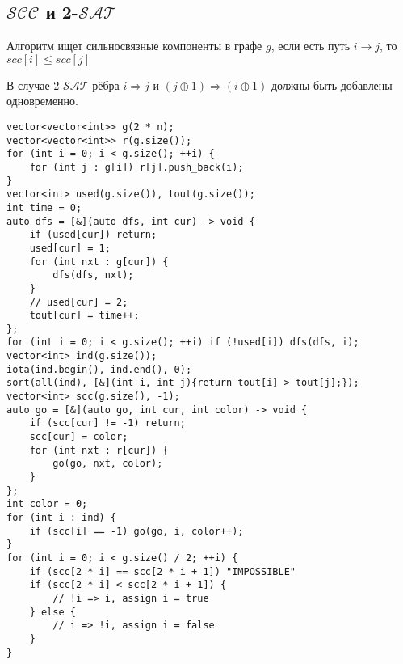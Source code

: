 \subsection{$\mathcal{SCC}$ и 2-$\mathcal{SAT}$}
Алгоритм ищет сильносвязные компоненты в графе $g$, если есть путь $i \rightarrow j$, то $scc[i] \le scc[j]$

В случае 2-$\mathcal{SAT}$ рёбра $i \Rightarrow j$ и $(j\oplus1) \Rightarrow (i \oplus 1)$ должны быть добавлены одновременно.
\begin{lstlisting}
vector<vector<int>> g(2 * n);
vector<vector<int>> r(g.size());
for (int i = 0; i < g.size(); ++i) {
    for (int j : g[i]) r[j].push_back(i);
}
vector<int> used(g.size()), tout(g.size());
int time = 0;
auto dfs = [&](auto dfs, int cur) -> void {
    if (used[cur]) return;
    used[cur] = 1;
    for (int nxt : g[cur]) {
        dfs(dfs, nxt);
    }
    // used[cur] = 2;
    tout[cur] = time++;
};
for (int i = 0; i < g.size(); ++i) if (!used[i]) dfs(dfs, i);
vector<int> ind(g.size());
iota(ind.begin(), ind.end(), 0);
sort(all(ind), [&](int i, int j){return tout[i] > tout[j];});
vector<int> scc(g.size(), -1);
auto go = [&](auto go, int cur, int color) -> void {
    if (scc[cur] != -1) return;
    scc[cur] = color;
    for (int nxt : r[cur]) {
        go(go, nxt, color);
    }
};
int color = 0;
for (int i : ind) {
    if (scc[i] == -1) go(go, i, color++);
}
for (int i = 0; i < g.size() / 2; ++i) {
    if (scc[2 * i] == scc[2 * i + 1]) "IMPOSSIBLE"
    if (scc[2 * i] < scc[2 * i + 1]) {
        // !i => i, assign i = true
    } else {
        // i => !i, assign i = false
    }
}
\end{lstlisting}

